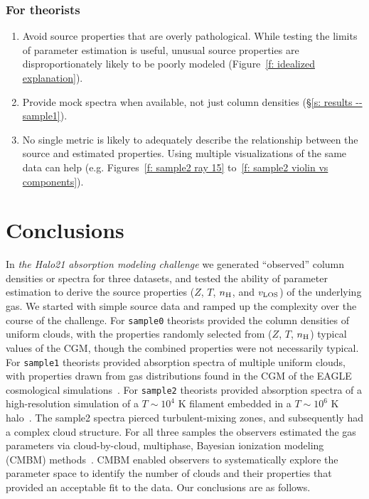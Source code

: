\documentclass[fleqn,usenatbib]{mnras}
\begin{document}
\subsubsection{For theorists}

\begin{enumerate}
    \item Avoid source properties that are overly pathological. While testing the limits of  parameter estimation is useful, unusual source properties are disproportionately likely to be poorly modeled (Figure~\ref{f: idealized explanation}).
    \item Provide mock spectra when available, not just column densities (\S\ref{s: results -- sample1}).
    \item No single metric is likely to adequately describe the relationship between the source and estimated properties. Using multiple visualizations of the same data can help (e.g. Figures~\ref{f: sample2 ray 15} to~\ref{f: sample2 violin vs components}).
\end{enumerate}

\section{Conclusions}
\label{s: conclusions}

In \textit{the Halo21 absorption modeling challenge} we generated ``observed'' column densities or spectra for three datasets,
and tested the ability of parameter estimation to derive the source properties ($Z$, $T$, $n_{\rm H}$, and $v_{\rm LOS}$) of the underlying gas.
We started with simple source data and ramped up the complexity over the course of the challenge.
For \texttt{sample0} theorists provided the column densities of uniform clouds, with the properties randomly selected from ($Z$, $T$, $n_{\rm H}$) 
typical values of the CGM, though the combined properties were not necessarily typical.
For \texttt{sample1} theorists provided absorption spectra of multiple uniform clouds, with properties drawn from gas distributions found in the CGM of the EAGLE cosmological simulations~\citep[e.g.][]{schaye2015EAGLE}.
For \texttt{sample2} theorists provided absorption spectra of a high-resolution simulation of a $T \sim 10^4$ K filament embedded in a $T \sim 10^6$ K halo~\citep{mandelker2020Instability}.
The sample2 spectra pierced turbulent-mixing zones, and subsequently had a complex cloud structure.
For all three samples the observers estimated the gas parameters via cloud-by-cloud, multiphase, Bayesian ionization modeling (CMBM) methods~\citep{sameer2021Cloudbycloud, sameer2022Probing}.
CMBM enabled observers to systematically explore the parameter space to identify the number of clouds and their properties that provided an acceptable fit to the data.
Our conclusions are as follows.
\end{document}
